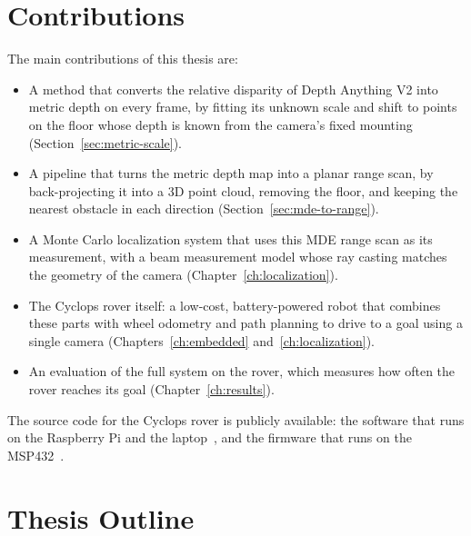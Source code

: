 \section{Contributions}
\label{sec:contributions}

The main contributions of this thesis are:
\begin{itemize}
  \item A method that converts the relative disparity of Depth Anything V2 into metric depth on
  every frame, by fitting its unknown scale and shift to points on the floor whose depth is known
  from the camera's fixed mounting (Section~\ref{sec:metric-scale}).

  \item A pipeline that turns the metric depth map into a planar range scan, by back-projecting it
  into a 3D point cloud, removing the floor, and keeping the nearest obstacle in each direction
  (Section~\ref{sec:mde-to-range}).

  \item A Monte Carlo localization system that uses this MDE range scan as its measurement, with a
  beam measurement model whose ray casting matches the geometry of the camera
  (Chapter~\ref{ch:localization}).

  \item The Cyclops rover itself: a low-cost, battery-powered robot that combines these parts with
  wheel odometry and path planning to drive to a goal using a single camera
  (Chapters~\ref{ch:embedded} and~\ref{ch:localization}).

  \item An evaluation of the full system on the rover, which measures how often the rover reaches
  its goal (Chapter~\ref{ch:results}).
\end{itemize}

The source code for the Cyclops rover is publicly available: the software that runs on the
Raspberry Pi and the laptop~\cite{cyclops_github}, and the firmware that runs on the
MSP432~\cite{cyclops_msp432_github}.

\section{Thesis Outline}
\label{sec:outline}

